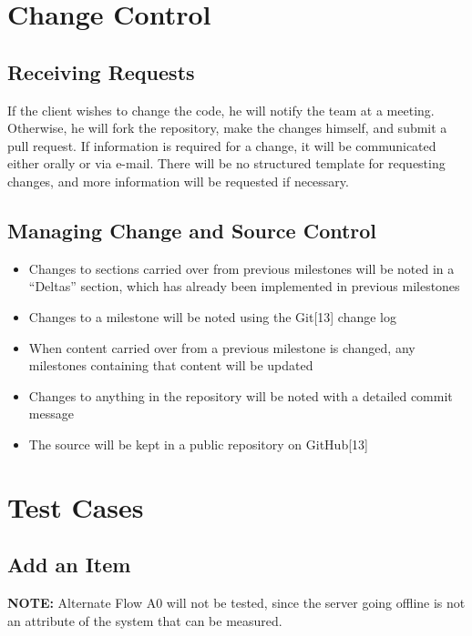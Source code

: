 \documentclass{article}
\begin{document}
\section{Change Control}

\subsection{Receiving Requests}
If the client wishes to change the code, he will notify the team at a meeting.  Otherwise, he will fork the repository, make the changes himself, and submit a pull request.  If information is required for a change, it will be communicated either orally or via e-mail.  There will be no structured template for requesting changes, and more information will be requested if necessary.

\subsection{Managing Change and Source Control}
\begin{itemize}
\item Changes to sections carried over from previous milestones will be noted in a ``Deltas'' section, which has already been implemented in previous milestones
\item Changes to a milestone will be noted using the Git[13] change log
\item When content carried over from a previous milestone is changed, any milestones containing that content will be updated
\item Changes to anything in the repository will be noted with a detailed commit message
\item The source will be kept in a public repository on GitHub[13]
\end{itemize}

\section{Test Cases}

\subsection{Add an Item}
\textbf{NOTE:} Alternate Flow A0 will not be tested, since the server going offline is not an attribute of the system that can be measured.
\end{document}
